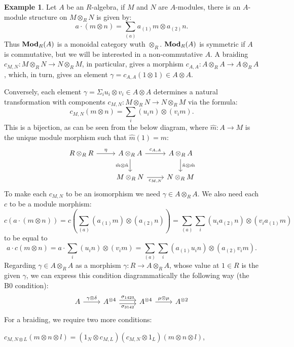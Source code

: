 \documentclass[8pt]{article}
\theoremstyle{definition}
\theoremstyle{definition}
\theoremstyle{definition}
\theoremstyle{definition}
\theoremstyle{definition}
\theoremstyle{definition}
\theoremstyle{definition}
\theoremstyle{definition}
\theoremstyle{definition}
\theoremstyle{definition}
\theoremstyle{definition}
\theoremstyle{definition}
\newtheorem{example}{Example}[section]
\theoremstyle{definition}
\theoremstyle{definition}
\theoremstyle{question}
\begin{document}
\begin{example}
  Let $A$ be an $R$-algebra, if $M$ and $N$ are $A$-modules, there is an $A$-module structure on $M \otimes_R N$ is given by:
  \[
  a \cdot (m \otimes n) = \sum \limits_{(a)} a_{(1)} m \otimes a_{(2)} n.
  \]
  Thus ${\bf Mod}_R(A)$ is a monoidal category wuth $\otimes_R$. ${\bf Mod}_R(A)$ is symmetric if $A$ is commutative, but we will be interested
  in a non-commutative $A$. A braiding $c_{M,N} : M \otimes_R N \to N \otimes_R M$, in particular, gives a morphism
  $c_{A,A} : A \otimes_R A \to A \otimes_R A$, which, in turn, gives an element $\gamma = c_{A, A} (1 \otimes 1) \in A \otimes A$.

  Conversely, each element $\gamma = \Sigma_i u_i \otimes v_i \in A \otimes A$ determines a natural transformation with components
  $c_{M,N} : M \otimes_R N \to N \otimes_R M$ via the formula:
  \[
  c_{M,N}(m \otimes n) = \sum \limits_{i} (u_i n) \otimes (v_i m).
  \]
  This is a bijection, as can be seen from the below diagram, where $\hat{m} : A \to M$ is the unique module morphism such that 
  $\hat{m}(1) = m$:
  \[
  \begin{tikzcd}
    R \otimes_R R \ar[r, "\eta"] & A \otimes_R A \ar[d, "\hat{m} \otimes \hat{n}"'] \ar[r, "c_{A,A}"] & A \otimes_R A \ar[d, "\hat{n} \otimes \hat{m}"] \\
    & M \otimes_R N \ar[r, "c_{M,N}"'] & N \otimes_R M
  \end{tikzcd}
  \]
  To make each $c_{M,N}$ to be an isomorphism we need $\gamma \in A \otimes_R A$. We also need each $c$ to be a module morphism:
  \[
  c(a \cdot (m \otimes n)) = c(\sum \limits_{(a)} (a_{(1)} m) \otimes (a_{(2)} n)) = \sum \limits_{(a)} \sum \limits_{i} (u_i a_{(2)} n) \otimes (v_i a_{(1)} m)
  \]
  to be equal to
  \[
  a \cdot c(m \otimes n) = a \cdot \sum \limits_{i} (u_i n) \otimes (v_i m) = \sum \limits_{(a)} \sum \limits_{i} (a_{(1)} u_i n) \otimes (a_{(2)} v_i m).
  \]
  Regarding $\gamma \in A \otimes_R A$ as a morphism $\gamma : R \to A \otimes_R A$, whose value at $1 \in R$ is the given $\gamma$,
  we can express this condition diagrammatically the following way (the B0 condition):
  \[
  \begin{tikzcd}
    A \ar[r, "\gamma \otimes \delta"] & A^{\otimes 4} \ar[r, shift left, "\sigma_{1423}"] \ar[r, shift right, "\sigma_{3142}"'] & A^{\otimes 4} \ar[r, "\mu \otimes \mu"] & A^{\otimes 2}
  \end{tikzcd}
  \]
  For a braiding, we require two more conditions:
  \begin{center}
    $c_{M, N \otimes L}(m \otimes n \otimes l) = (1_N \otimes c_{M,L}) (c_{M,N} \otimes 1_L)(m \otimes n \otimes l)$,


\end{center}
\end{example}
\end{document}
